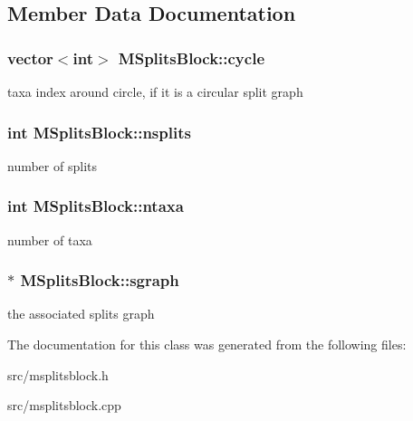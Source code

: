 \subsection{Member Data Documentation}
\hypertarget{classMSplitsBlock_a243b83ab3a6a5c3206da496475765d9d}{
\subsubsection[{cycle}]{\setlength{\rightskip}{0pt plus 5cm}vector$<$int$>$ {\bf MSplitsBlock::cycle}}}
\label{classMSplitsBlock_a243b83ab3a6a5c3206da496475765d9d}
taxa index around circle, if it is a circular split graph \hypertarget{classMSplitsBlock_a6cc2af084a4652277e09c85b2feaea37}{
\subsubsection[{nsplits}]{\setlength{\rightskip}{0pt plus 5cm}int {\bf MSplitsBlock::nsplits}}}
\label{classMSplitsBlock_a6cc2af084a4652277e09c85b2feaea37}
number of splits \hypertarget{classMSplitsBlock_abe567d446c6da8b7f31a3ac1e975cf2b}{
\subsubsection[{ntaxa}]{\setlength{\rightskip}{0pt plus 5cm}int {\bf MSplitsBlock::ntaxa}}}
\label{classMSplitsBlock_abe567d446c6da8b7f31a3ac1e975cf2b}
number of taxa \hypertarget{classMSplitsBlock_a6b5251e50f2faf8c1ae161d2c76ca266}{
\subsubsection[{sgraph}]{$\ast$ {\bf MSplitsBlock::sgraph}}}
\label{classMSplitsBlock_a6b5251e50f2faf8c1ae161d2c76ca266}
the associated splits graph 

The documentation for this class was generated from the following files:\begin{DoxyCompactItemize}
\item 
src/msplitsblock.h\item 
src/msplitsblock.cpp\end{DoxyCompactItemize}
